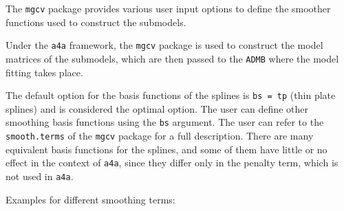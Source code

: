 \documentclass[
]{book}
\begin{document}
The \texttt{mgcv} package provides various user input options to define the smoother functions used to construct the submodels.

Under the \texttt{a4a} framework, the \texttt{mgcv} package is used to construct the model matrices of the submodels, which are then passed to the \texttt{ADMB} where the model fitting takes place.

The default option for the basis functions of the splines is \texttt{bs\ =\ tp} (thin plate splines) and is considered the optimal option. The user can define other smoothing basis functions using the \texttt{bs} argument. The user can refer to the \texttt{smooth.terms} of the \texttt{mgcv} package for a full description. There are many equivalent basis functions for the splines, and some of them have little or no effect in the context of \texttt{a4a}, since they differ only in the penalty term, which is not used in \texttt{a4a}.

Examples for different smoothing terms:
\end{document}
